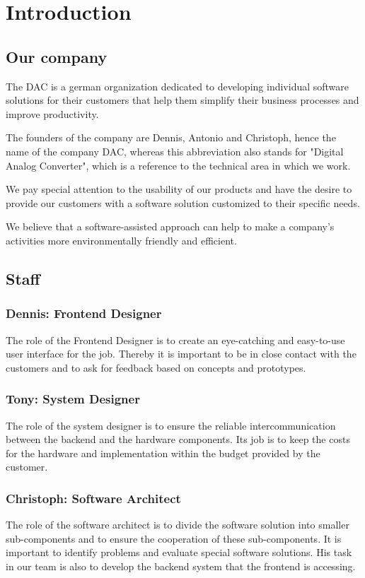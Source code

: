 \documentclass
[
 11pt, %
       DIV12,
       a4paper,
       oneside,
       parskip=half,
       headings=normal,
       bibliography=totoc,
       index=totoc,
       captions=tableheading,
       ]{article}
\author{Dennis Müller}
\date{\today}
\title{}
\begin{document}
\tableofcontents

\section{Introduction}
\label{sec:org2cca239}

\subsection{Our company}
\label{sec:org995f6be}
The DAC is a german organization dedicated to developing individual software
solutions for their customers that help them simplify their business processes
and improve productivity.

The founders of the company are Dennis, Antonio and Christoph, hence the name of
the company DAC, whereas this abbreviation also stands for "Digital Analog
Converter", which is a reference to the technical area in which we work.

We pay special attention to the usability of our products and have the desire to
provide our customers with a software solution customized to their specific
needs.

We believe that a software-assisted approach can help to make a company's
activities more environmentally friendly and efficient.

\subsection{Staff}
\label{sec:org1572fea}
\subsubsection{Dennis: Frontend Designer}
\label{sec:orga56d5bb}
The role of the Frontend Designer is to create an eye-catching and easy-to-use
user interface for the job. Thereby it is important to be in close contact
with the customers and to ask for feedback based on concepts and prototypes.
\subsubsection{Tony: System Designer}
\label{sec:orgcc88507}
The role of the system designer is to ensure the reliable intercommunication between the backend and the hardware components.
Its job is to keep the costs for the hardware and implementation within the budget provided by the customer.
\subsubsection{Christoph: Software Architect}
\label{sec:orgbce2240}
The role of the software architect is to divide the software solution into
smaller sub-components and to ensure the cooperation of these sub-components. It
is important to identify problems and evaluate special software solutions. His
task in our team is also to develop the backend system that the frontend is
accessing.
\end{document}
